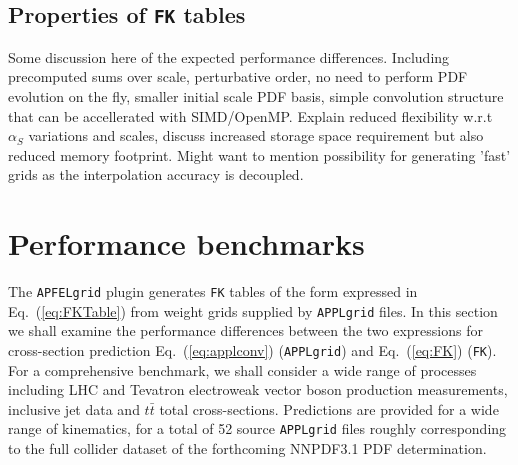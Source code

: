 \documentclass[preprint,12pt]{elsarticle}
\begin{document}
\subsection{Properties of {\tt FK} tables}
Some discussion here of the expected performance differences. Including precomputed sums over scale, perturbative order, no need to perform PDF evolution on the fly, smaller initial scale PDF basis, simple convolution structure that can be accellerated with SIMD/OpenMP.
Explain reduced flexibility w.r.t $\alpha_S$ variations and scales, discuss increased storage space requirement but also reduced memory footprint.
Might want to mention possibility for generating 'fast' grids as the interpolation accuracy is decoupled.

\section{Performance benchmarks}

The {\tt APFELgrid} plugin generates {\tt FK} tables of the form expressed in Eq.~(\ref{eq:FKTable}) from weight grids supplied by {\tt APPLgrid} files. In this section we shall examine the performance differences between the two expressions for cross-section prediction Eq.~(\ref{eq:applconv}) ({\tt APPLgrid}) and Eq.~(\ref{eq:FK}) ({\tt FK}). For a comprehensive benchmark, we shall consider a wide range of processes including LHC and Tevatron electroweak vector boson production measurements, inclusive jet data and $t\bar{t}$ total cross-sections. Predictions are provided for a wide range of kinematics, for a total of 52 source {\tt APPLgrid} files roughly corresponding to the full collider dataset of the forthcoming NNPDF3.1 PDF determination.
\end{document}
